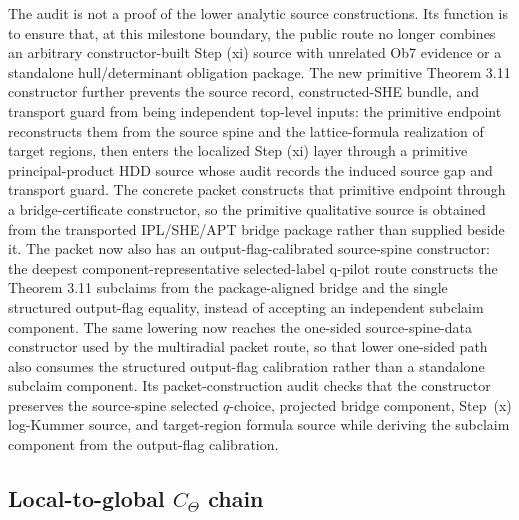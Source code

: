 \documentclass[11pt]{article}
\newcommand{\CTheta}{C_\Theta}
\theoremstyle{plain}
\theoremstyle{definition}
\theoremstyle{remark}
\begin{document}
The audit is not a proof of the lower analytic source constructions.  Its
function is to ensure that, at this milestone boundary, the public route no
longer combines an arbitrary constructor-built Step (xi) source with unrelated
Ob7 evidence or a standalone hull/determinant obligation package.  The
new primitive Theorem 3.11 constructor further prevents the source record,
constructed-SHE bundle, and transport guard from being independent top-level
inputs: the primitive endpoint reconstructs them from the source spine and the
lattice-formula realization of target regions, then enters the localized
Step (xi) layer through a primitive principal-product HDD source whose audit
records the induced source gap and transport guard.  The concrete packet
constructs that primitive endpoint through a bridge-certificate constructor, so
the primitive qualitative source is obtained from the transported IPL/SHE/APT
bridge package rather than supplied beside it.  The packet now also has an
output-flag-calibrated source-spine constructor: the deepest
component-representative selected-label q-pilot route constructs the
Theorem 3.11 subclaims from the package-aligned bridge and the single
structured output-flag equality, instead of accepting an independent subclaim
component.  The same lowering now reaches the one-sided source-spine-data
constructor used by the multiradial packet route, so that lower one-sided path
also consumes the structured output-flag calibration rather than a standalone
subclaim component.  Its packet-construction audit checks that the constructor
preserves the source-spine selected \(q\)-choice, projected bridge component,
Step~(x) log-Kummer source, and target-region formula source while deriving the
subclaim component from the output-flag calibration.

\subsection{\texorpdfstring{Local-to-global \(\CTheta\) chain}{Local-to-global CTheta chain}}
\end{document}
